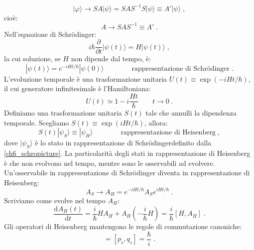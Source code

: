 \documentclass[10pt,a4paper]{report}
\theoremstyle{definition}
\newcommand{\dev}[3][]{\frac{\mathrm{d}^{#1} #2}{\mathrm{d} #3^{#1}}}
\numberwithin{equation}{section}
\newcommand{\ket}{\rangle}
\newcommand{\Sch}{Schrödinger}
\begin{document}
$$
|\varphi\ket\to SA|\psi\ket=SAS^{-1}S|\psi\ket\equiv A'|\psi\ket\;,
$$
cioè:
$$
A\to SAS^{-1}\equiv A'\;.
$$
Nell'equazione di \Sch:
\begin{equation}
i\hbar\frac{\partial}{\partial t}|\psi(t)\ket=H|\psi(t)\ket\;,
\end{equation}
la cui soluzione, se $H$ non dipende dal tempo, è:
\begin{equation}
|\psi(t)\ket=e^{-iHt/\hbar}|\psi(0)\ket \qquad\qquad\mbox{rappresentazione di \Sch}\;. \label{ch6_schropicture}
\end{equation}
L'evoluzione temporale è una trasformazione unitaria $U(t)\equiv \exp(-iHt/\hbar)$, il cui generatore infinitesimale è l'Hamiltoniana:
\begin{equation}
U(t)\simeq 1-i\frac{Ht}{\hbar} \qquad t\to 0\;.
\end{equation}
Definiamo una trasformazione unitaria $S(t)$ tale che annulli la dipendenza temporale. Scegliamo $S(t)\equiv \exp(iHt/\hbar)$, allora:
\begin{equation}
S(t)|\psi_S\ket \equiv |\psi_H\ket \qquad\qquad\mbox{rappresentazione di Heisenberg}\;, \label{ch6_heisenpicture}
\end{equation}
dove $|\psi_S\ket$ è lo stato in rappresentazione di \Sch definito dalla \eqref{ch6_schropicture}. La particolarità degli stati in rappresentazione di Heisenberg è che non evolvono nel tempo, mentre sono le osservabili ad evolvere. Un'osservabile in rappresentazione di \Sch\; diventa in rappresentazione di Heisenberg:
\begin{equation}
A_S\to A_H=e^{-iHt/\hbar}A_Se^{iHt/\hbar}\;.
\end{equation}
Scriviamo come evolve nel tempo $A_H$:
\begin{equation}
\dev{A_H(t)}{t}=\frac{i}{\hbar}HA_H+A_H\left(-\frac{i}{\hbar}H\right)=\frac{i}{\hbar}[H,A_H]\;.
\end{equation}
Gli operatori di Heisenberg mantengono le regole di commutazione canoniche:
\begin{equation}
[p_H,q_H]=[p_s,q_s]=\frac{\hbar}{i}\;.
\end{equation}
\end{document}
